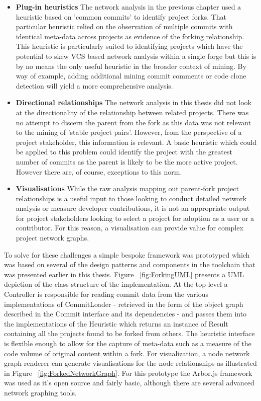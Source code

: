 \begin{itemize}
\item  \textbf{Plug-in heuristics} The network analysis in the previous chapter used a heuristic based on 'common commits' to identify project forks. That particular heuristic relied on the observation of multiple commits with identical meta-data across projects as evidence of the forking relationship. This heuristic is particularly suited to identifying projects which have the potential to skew VCS based network analysis within a single forge but this is by no means the only useful heuristic in the broader context of mining. By way of example, adding additional mining commit comments or code clone detection will yield a more comprehensive analysis.
\item  \textbf{Directional relationships} The network analysis in this thesis did not look at the directionality of the relationship between related projects. There was no attempt to discern the parent from the fork as this data was not relevant to the mining of 'stable project pairs'. However, from the perspective of a project stakeholder, this information is relevant. A basic heuristic which could be applied to this problem could identify the project with the greatest number of commits as the parent is likely to be the more active project. However there are, of course, exceptions to this norm.
\item  \textbf{Visualisations} While the raw analysis mapping out parent-fork project relationships is a useful input to those looking to conduct detailed network analysis or measure developer contributions, it is not an appropriate output for project stakeholders looking to select a project for adoption as a user or a contributor. For this reason, a visualisation can provide value for complex project network graphs.
\end{itemize}

To solve for these challenges a simple bespoke framework was prototyped which was based on several of the design patterns and components in the toolchain that was presented earlier in this thesis. Figure ~\ref{fig:ForkingUML} presents a UML depiction of the class structure of the implementation. At the top-level a Controller is responsible for reading commit data from the various implementations of CommitLoader - retrieved in the form of the object graph described in the Commit interface and its dependencies - and passes them into the implementations of the Heuristic which returns an instance of Result containing all the projects found to be forked from others. The heuristic interface is flexible enough to allow for the capture of meta-data such as a measure of the code volume of original content within a fork. For visualization, a node network graph renderer can generate visualisations for the node relationships as illustrated in Figure ~\ref{fig:ForkedNetworkGraph}. For this prototype the Arbor.js framework was used as it's open source and fairly basic, although there are several advanced network graphing tools.

